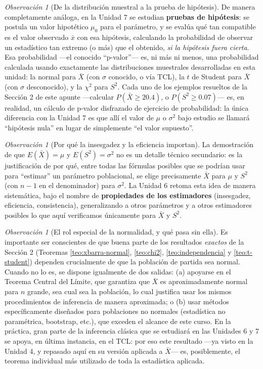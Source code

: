 \documentclass[11pt,a4paper]{article}
\theoremstyle{plain}
\theoremstyle{definition}
\theoremstyle{remark}
\newtheorem{observacion}[teorema]{Observación}
\begin{document}
\begin{observacion}[De la distribución muestral a la prueba de hipótesis]
De manera completamente análoga, en la Unidad 7 se estudian \textbf{pruebas de hipótesis}: se postula un valor hipotético $\mu_0$ para el parámetro, y se evalúa qué tan compatible es el valor observado $\bar x$ con esa hipótesis, calculando la probabilidad de observar un estadístico tan extremo (o más) que el obtenido, \emph{si la hipótesis fuera cierta}. Esa probabilidad —el conocido ``p-valor''— es, ni más ni menos, una probabilidad calculada usando exactamente las distribuciones muestrales desarrolladas en esta unidad: la normal para $\bar X$ (con $\sigma$ conocido, o vía TCL), la $t$ de Student para $\bar X$ (con $\sigma$ desconocido), y la $\chi^2$ para $S^2$. Cada uno de los ejemplos resueltos de la Sección 2 de este apunte —calcular $P(\bar X\geq 20.4)$, o $P(S^2\geq 0.07)$— es, en realidad, un cálculo de p-valor disfrazado de ejercicio de probabilidad: la única diferencia con la Unidad 7 es que allí el valor de $\mu$ o $\sigma^2$ bajo estudio se llamará ``hipótesis nula'' en lugar de simplemente ``el valor supuesto''.
\end{observacion}

\begin{observacion}[Por qué la insesgadez y la eficiencia importan]
La demostración de que $E(\bar X)=\mu$ y $E(S^2)=\sigma^2$ no es un detalle técnico secundario: es la justificación de por qué, entre todas las fórmulas posibles que se podrían usar para ``estimar'' un parámetro poblacional, se elige precisamente $\bar X$ para $\mu$ y $S^2$ (con $n-1$ en el denominador) para $\sigma^2$. La Unidad 6 retoma esta idea de manera sistemática, bajo el nombre de \textbf{propiedades de los estimadores} (insesgadez, eficiencia, consistencia), generalizando a otros parámetros y a otros estimadores posibles lo que aquí verificamos únicamente para $\bar X$ y $S^2$.
\end{observacion}

\begin{observacion}[El rol especial de la normalidad, y qué pasa sin ella]
Es importante ser conscientes de que buena parte de los resultados \emph{exactos} de la Sección 2 (Teoremas \ref{teo:xbarra-normal}, \ref{teo:chi2}, \ref{teo:independencia} y \ref{teo:t-student}) dependen crucialmente de que la población de partida sea normal. Cuando no lo es, se dispone igualmente de dos salidas: (a) apoyarse en el Teorema Central del Límite, que garantiza que $\bar X$ es aproximadamente normal para $n$ grande, sea cual sea la población, lo cual justifica usar los mismos procedimientos de inferencia de manera aproximada; o (b) usar métodos específicamente diseñados para poblaciones no normales (estadística no paramétrica, bootstrap, etc.), que exceden el alcance de este curso. En la práctica, gran parte de la inferencia clásica que se estudiará en las Unidades 6 y 7 se apoya, en última instancia, en el TCL: por eso este resultado —ya visto en la Unidad 4, y repasado aquí en su versión aplicada a $\bar X$— es, posiblemente, el teorema individual más utilizado de toda la estadística aplicada.
\end{observacion}
\end{document}

